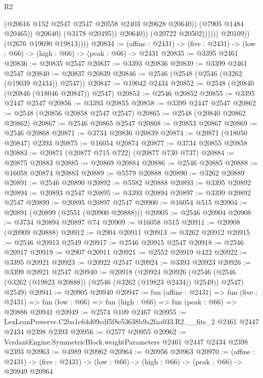 \begin{lexlean}{R2}
\begin{coremodule}
                                    (@20616 @152 @2547 @2547 @20558 @2403 @20628 @20640))
                                  (@7905 @1484 @20465))
                                @20640)
                              (@3178 @20495))
                            @20640))
                        (@20722 @20502))))))
              @20109))
          (@2676 @19690 @19813))))
@20834 := (affine : @2431) -> (five : @2431) -> (low : @66) -> (high : @66) -> (peak : @66) -> @2431
@20835 := @3395 @2461
@20836 := @20835 @2547
@20837 := @3393 @20836
@20839 := @3399 @2461 @2547
@20840 := @20837 @20839
@20846 := @2546 (@2548 (@2546 (@3262 (@19039 @2434)) @2547))
@20847 := @19042 @2434
@20852 := @2548 (@20840 (@20846 (@18046 @20847)) @2547)
@20853 := @2546 @20852
@20855 := @3395 @2447 @2547
@20856 := @3393 @20855
@20858 := @3399 @2447 @2547
@20862 := @2548 (@20856 @20858 @2547 @2547)
@20865 := @2548 (@20840 @20862 @20862)
@20867 := @2546 @20865 @2547
@20868 := @20853 @20867
@20869 := @2546 @20868
@20871 := @3734 @20836 @20839
@20874 := @20871 (@18050 @20847) @2393
@20875 := @16054 @20874
@20877 := @3734 @20855 @20858
@20883 := @20871 (@20877 @715 @722) (@20877 @730 @737)
@20884 := @20875 @20883
@20885 := @20869 @20884
@20886 := @2546 @20885
@20888 := @16058 @20874 @20883
@20889 := @5579 @20888
@20890 := @3262 @20889
@20891 := @2546 @20890
@20892 := @5582 @20888
@20893 := @3395 @20892
@20894 := @20893 @2547
@20895 := @3393 @20894
@20897 := @3399 @20892 @2547
@20899 := @20895 @20897 @2547
@20900 := @16054 @515
@20904 := @20891 (@20899 (@2551 (@20900 @20888)))
@20905 := @2546 @20904
@20908 := @3734 @20894 @20897 @74
@20909 := @16058 @515
@20911 := @20908 (@20909 @20888)
@20912 := @2904 @20911
@20913 := @3262 @20912
@20915 := @2546 @20913 @2549
@20917 := @2546 @20915 @2547
@20918 := @2546 @20917
@20919 := @2907 @20911
@20921 := @2552 @20919 @422
@20922 := @3395 @20921
@20923 := @20922 @2547
@20924 := @3393 @20923
@20926 := @3399 @20921 @2547
@20940 := @20918
    (@20924
      @20926
      (@2546 (@2546 (@3262 (@19823 @20888)) (@2546 (@3262 (@19823 @2434)) @2549)) @2547)
      @2549)
@20941 := @20905 @20940
@20947 := fun (affine : @2431) =>
  fun (five : @2431) => fun (low : @66) => fun (high : @66) => fun (peak : @66) => @20886 @20941
@20949 := @2574 @109 @2467
@20955 := LexLeanPreserve.C2ba1c64d09cdf5f8e53638b9a2faa033.R2.__fits_2
    @2461
    @2447
    @2434
    @2398
    @2393
@20956 := @2577 @20955
@20962 := VerdantEngine.SymmetricBlock.weightParameters @2461 @2447 @2434 @2398 @2393
@20963 := @4989 @20962
@20964 := @20956 @20963
@20970 := (affine : @2431) ->
  (five : @2431) -> (low : @66) -> (high : @66) -> (peak : @66) -> @20949 @20964

\end{coremodule}
\end{lexlean}
